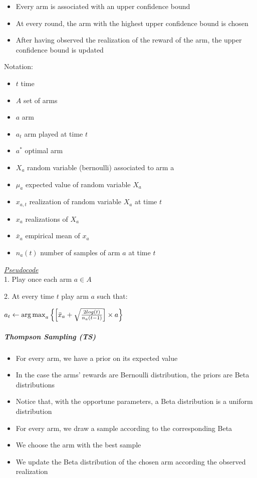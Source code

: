 \begin{itemize}
	\item Every arm is associated with an upper confidence bound 
	\item At every round, the arm with the highest upper confidence bound is chosen
	\item After having observed the realization of the reward of the arm, the upper confidence bound is updated
\end{itemize}
Notation:\\
\begin{itemize}
\item $t$ time
\item $A$ set of arms
\item $a$ arm
\item $a_{t}$ arm played at time $t$
\item $a^*$ optimal arm
\item $X_{a}$ random variable (bernoulli) associated to arm a
\item $\mu_{a}$ expected value of random variable $X_{a}$
\item $x_{a,t}$ realization of random variable $X_{a}$ at time $t$
\item $x_{a}$ realizations of $X_{a}$
\item $\bar{x}_{a}$ empirical mean of $x_{a}$
\item $n_{a}(t)$ number of samples of arm $a$ at time $t$
\end{itemize}

\underline{\textit{Pseudocode}}\\

1. Play once each arm $a \in A$

2. At every time $t$ play arm $a$ such that:

\hspace{2em}$a_{t} \leftarrow \operatorname{arg\,max}_a{\left\{\left[\bar{x}_{a} + \sqrt{\frac{2 log(t)}{{n_{a}(t-1)}} }\right]\times a\right\}}$

\subparagraph*{Thompson Sampling (TS)}

\begin{itemize}
	\item For every arm, we have a prior on its expected value 
	\item In the case the arms’ rewards are Bernoulli distribution, the priors are Beta distributions
	\item Notice that, with the opportune parameters, a Beta distribution is a uniform distribution 
	\item For every arm, we draw a sample according to the corresponding Beta
	\item We choose the arm with the best sample 
	\item We update the Beta distribution of the chosen arm according the observed realization
\end{itemize}

